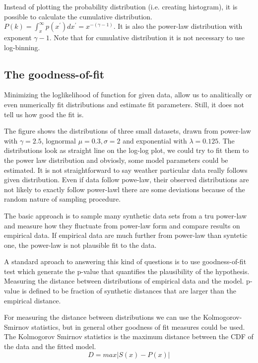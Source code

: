 Instead of plotting the probability distribution (i.e. creating histogram), it is possible to calculate the cumulative distribution. $P(k) = \int_{x}^{\infty} p(x^{'}) dx^{'} = x^{-(\gamma-1)}$. It is also the power-law distribution with exponent $\gamma-1$. Note that for cumulative distribution it is not necessary to use log-binning. 


\subsection{The goodness-of-fit}

Minimizing the loglikelihood of function for given data, allow us to analitically or even numerically fit distributions and estimate fit parameters. Still, it does not tell us how good the fit is. 

The figure shows the distributions of three small datasets, drawn from power-law with $\gamma=2.5$, lognormal $\mu=0.3, \sigma=2$ and exponential with $\lambda=0.125$. The distributions look as straight line on the log-log plot, we could try to fit them to the power law distribution and obviosly, some model parameters could be estimated. It is not straightforward to say weather particular data really follows given distribution. Even if data follow powe-law, their observed distributions are not likely to exactly follow power-lawl there are some deviations because of the random nature of sampling procedure. 

The basic approach is to sample many synthetic data sets from a tru power-law and measure how they fluctuate from power-law form and compare results on empirical data. If empirical data are much further from power-law than syntetic one, the power-law is not plausible fit to the data. 


A standard aproach to answering this kind of questions is to use goodness-of-fit test which generate the p-value that quantifies the plausibility of the hypothesis. Measuring the distance between distributions of empirical data and the model. p-value is defined to be fraction of synthetic distances that are larger than the empirical distance. 

For measuring the distance between distributions we can use the Kolmogorov-Smirnov statistics, but in general other goodness of fit measures could be used.
The Kolmogorov Smirnov statistics is the maximum distance between the CDF of the data and the fitted model.  
\begin{equation}
D = max |S(x) - P(x)|
\end{equation}

